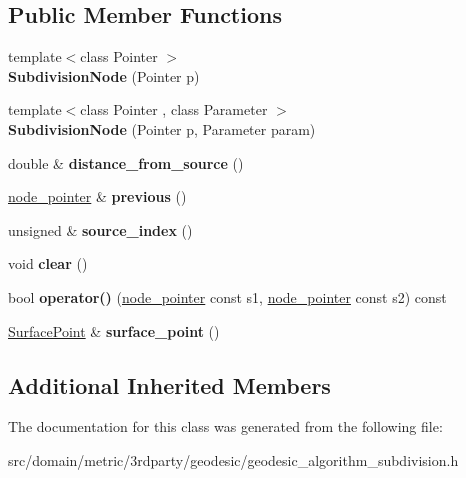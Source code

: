 \subsection*{Public Member Functions}
\begin{DoxyCompactItemize}
\item 
\hypertarget{classgeodesic_1_1_subdivision_node_abf4ef4daf710d316bf229201db92d6a9}{}{\footnotesize template$<$class Pointer $>$ }\\{\bfseries Subdivision\+Node} (Pointer p)\label{classgeodesic_1_1_subdivision_node_abf4ef4daf710d316bf229201db92d6a9}

\item 
\hypertarget{classgeodesic_1_1_subdivision_node_abb78ff215fac37ef704efe012d62ef3c}{}{\footnotesize template$<$class Pointer , class Parameter $>$ }\\{\bfseries Subdivision\+Node} (Pointer p, Parameter param)\label{classgeodesic_1_1_subdivision_node_abb78ff215fac37ef704efe012d62ef3c}

\item 
\hypertarget{classgeodesic_1_1_subdivision_node_a42c0007d3012c720a858655c671554d2}{}double \& {\bfseries distance\+\_\+from\+\_\+source} ()\label{classgeodesic_1_1_subdivision_node_a42c0007d3012c720a858655c671554d2}

\item 
\hypertarget{classgeodesic_1_1_subdivision_node_a619002aa4d9d50c85c9094b6b88b6cce}{}\hyperlink{classgeodesic_1_1_subdivision_node}{node\+\_\+pointer} \& {\bfseries previous} ()\label{classgeodesic_1_1_subdivision_node_a619002aa4d9d50c85c9094b6b88b6cce}

\item 
\hypertarget{classgeodesic_1_1_subdivision_node_ab774d463d8c190e6cfa2d4b4420d91fa}{}unsigned \& {\bfseries source\+\_\+index} ()\label{classgeodesic_1_1_subdivision_node_ab774d463d8c190e6cfa2d4b4420d91fa}

\item 
\hypertarget{classgeodesic_1_1_subdivision_node_ad6bb6fa49142f3ced9b8494a08cba530}{}void {\bfseries clear} ()\label{classgeodesic_1_1_subdivision_node_ad6bb6fa49142f3ced9b8494a08cba530}

\item 
\hypertarget{classgeodesic_1_1_subdivision_node_aa3a2ee2fd0d3bf00b094fdf414c0c34a}{}bool {\bfseries operator()} (\hyperlink{classgeodesic_1_1_subdivision_node}{node\+\_\+pointer} const s1, \hyperlink{classgeodesic_1_1_subdivision_node}{node\+\_\+pointer} const s2) const \label{classgeodesic_1_1_subdivision_node_aa3a2ee2fd0d3bf00b094fdf414c0c34a}

\item 
\hypertarget{classgeodesic_1_1_subdivision_node_a70eefd438fcae432b3800e10ebd824eb}{}\hyperlink{classgeodesic_1_1_surface_point}{Surface\+Point} \& {\bfseries surface\+\_\+point} ()\label{classgeodesic_1_1_subdivision_node_a70eefd438fcae432b3800e10ebd824eb}

\end{DoxyCompactItemize}
\subsection*{Additional Inherited Members}


The documentation for this class was generated from the following file\+:\begin{DoxyCompactItemize}
\item 
src/domain/metric/3rdparty/geodesic/geodesic\+\_\+algorithm\+\_\+subdivision.\+h\end{DoxyCompactItemize}
